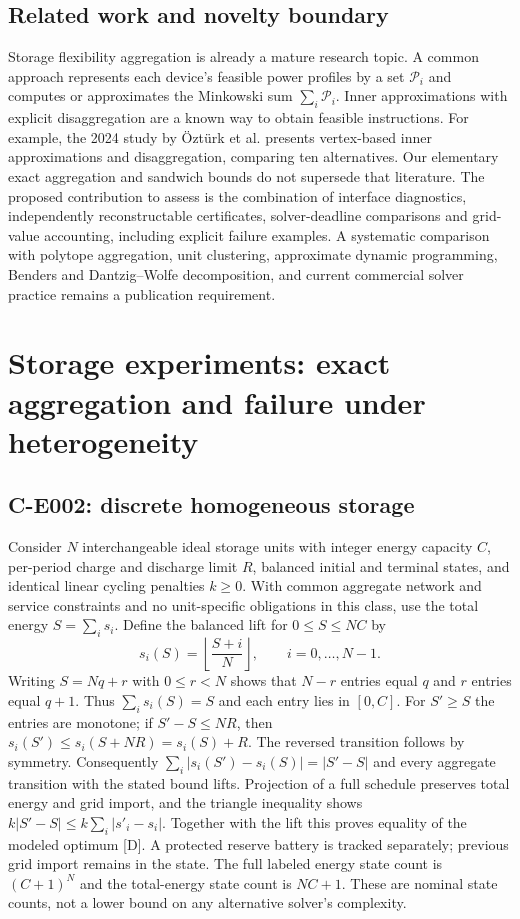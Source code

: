\documentclass[11pt,letterpaper]{article}
\begin{document}
\subsection{Related work and novelty boundary}
Storage flexibility aggregation is already a mature research topic. A common approach represents each device's feasible power profiles by a set $\mathcal P_i$ and computes or approximates the Minkowski sum $\sum_i\mathcal P_i$. Inner approximations with explicit disaggregation are a known way to obtain feasible instructions. For example, the 2024 study by \"Ozt\"urk et al. \cite{minkowski} presents vertex-based inner approximations and disaggregation, comparing ten alternatives. Our elementary exact aggregation and sandwich bounds do not supersede that literature. The proposed contribution to assess is the combination of interface diagnostics, independently reconstructable certificates, solver-deadline comparisons and grid-value accounting, including explicit failure examples. A systematic comparison with polytope aggregation, unit clustering, approximate dynamic programming, Benders and Dantzig--Wolfe decomposition, and current commercial solver practice remains a publication requirement.

\section{Storage experiments: exact aggregation and failure under heterogeneity}
\label{sec:storage}
\subsection{C-E002: discrete homogeneous storage}
Consider $N$ interchangeable ideal storage units with integer energy capacity $C$, per-period charge and discharge limit $R$, balanced initial and terminal states, and identical linear cycling penalties $k\ge0$. With common aggregate network and service constraints and no unit-specific obligations in this class, use the total energy $S=\sum_i s_i$. Define the balanced lift for $0\le S\le NC$ by
\[
s_i(S)=\left\lfloor\frac{S+i}{N}\right\rfloor,\qquad i=0,\ldots,N-1.
\]
Writing $S=Nq+r$ with $0\le r<N$ shows that $N-r$ entries equal $q$ and $r$ entries equal $q+1$. Thus $\sum_i s_i(S)=S$ and each entry lies in $[0,C]$. For $S'\ge S$ the entries are monotone; if $S'-S\le NR$, then $s_i(S')\le s_i(S+NR)=s_i(S)+R$. The reversed transition follows by symmetry. Consequently $\sum_i|s_i(S')-s_i(S)|=|S'-S|$ and every aggregate transition with the stated bound lifts. Projection of a full schedule preserves total energy and grid import, and the triangle inequality shows $k|S'-S|\le k\sum_i|s'_i-s_i|$. Together with the lift this proves equality of the modeled optimum [D]. A protected reserve battery is tracked separately; previous grid import remains in the state. The full labeled energy state count is $(C+1)^N$ and the total-energy state count is $NC+1$. These are nominal state counts, not a lower bound on any alternative solver's complexity.
\end{document}
